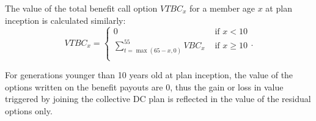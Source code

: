\documentclass{sfuthesis}
\numberwithin{equation}{chapter}
\begin{document}
	
		\justify
		The value of the total benefit call option $VTBC_{x}$ for a member age $x$ at plan inception is calculated similarly:
		\begin{equation}
		\label{eq:VB_20}
		VTBC_{x} = \left\{
		\begin{array}{ll}
		0 &\text{ if } x<10\\
		\sum\limits_{t=\max(65-x,0)}^{55} VBC_{x} &\text{ if } x\geqslant 10\\
		\end{array}
		\right..
		\end{equation}
	
	
		\justify
		For generations younger than 10 years old at plan inception, the value of the options written on the benefit payouts are $0$, thus the gain or loss in value triggered by joining the collective DC plan is reflected in the value of the residual options only.
	
\end{document}
